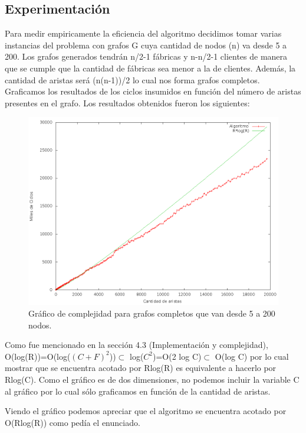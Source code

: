 \subsection{Experimentación}

Para medir empiricamente la eficiencia del algoritmo decidimos tomar varias instancias del problema con grafos G cuya cantidad de nodos (n) va desde 5 a 200. Los grafos generados tendrán n/2-1 fábricas y n-n/2-1 clientes de manera que se cumple que la cantidad de fábricas sea menor a la de clientes. Además, la cantidad de aristas será (n(n-1))/2 lo cual nos forma grafos completos. Graficamos los resultados de los ciclos insumidos en función del número de aristas presentes en el grafo. Los resultados obtenidos fueron los siguientes:

\begin{figure}[H]
\center
\includegraphics[scale=0.40]{ej3/imgs/complejidad.png}
\caption[Long caption]{Gráfico de complejidad para grafos completos que van desde 5 a 200 nodos.}
\label{pic-a}
\end{figure}

Como fue mencionado en la sección 4.3 (Implementación y complejidad), O(log(R))=O(log($(C+F)^2$))$\subset$ log($C^2$)=O(2 log C)$\subset$ O(log C) por lo cual mostrar que se encuentra acotado por Rlog(R) es equivalente a hacerlo por Rlog(C). Como el gráfico es de dos dimensiones, no podemos incluir la variable C al gráfico por lo cual sólo graficamos en función de la cantidad de aristas.

Viendo el gráfico podemos apreciar que el algoritmo se encuentra acotado por O(Rlog(R)) como pedía el enunciado.


